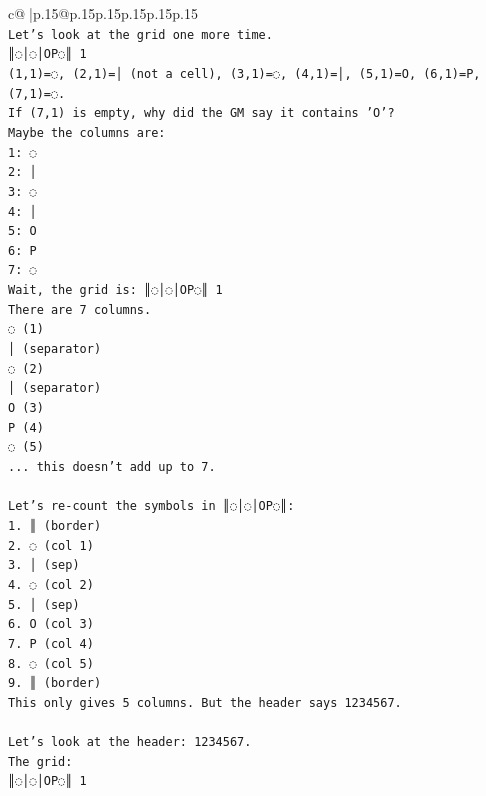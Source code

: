 \documentclass{article}
\begin{document}
{\begin{supertabular}{c@{$\;$}|p{.15\linewidth}@{}p{.15\linewidth}p{.15\linewidth}p{.15\linewidth}p{.15\linewidth}p{.15\linewidth}}
{{{\\ 
\texttt{Let's look at the grid one more time.} \\
\texttt{║◌│◌│OP◌║ 1} \\
\texttt{(1,1)=◌, (2,1)=│ (not a cell), (3,1)=◌, (4,1)=│, (5,1)=O, (6,1)=P, (7,1)=◌.} \\
\texttt{If (7,1) is empty, why did the GM say it contains 'O'?} \\
\texttt{Maybe the columns are:} \\
\texttt{1: ◌} \\
\texttt{2: │} \\
\texttt{3: ◌} \\
\texttt{4: │} \\
\texttt{5: O} \\
\texttt{6: P} \\
\texttt{7: ◌} \\
\texttt{Wait, the grid is: ║◌│◌│OP◌║ 1} \\
\texttt{There are 7 columns.} \\
\texttt{◌ (1)} \\
\texttt{│ (separator)} \\
\texttt{◌ (2)} \\
\texttt{│ (separator)} \\
\texttt{O (3)} \\
\texttt{P (4)} \\
\texttt{◌ (5)} \\
\texttt{... this doesn't add up to 7.} \\
\\ 
\texttt{Let's re{-}count the symbols in ║◌│◌│OP◌║:} \\
\texttt{1. ║ (border)} \\
\texttt{2. ◌ (col 1)} \\
\texttt{3. │ (sep)} \\
\texttt{4. ◌ (col 2)} \\
\texttt{5. │ (sep)} \\
\texttt{6. O (col 3)} \\
\texttt{7. P (col 4)} \\
\texttt{8. ◌ (col 5)} \\
\texttt{9. ║ (border)} \\
\texttt{This only gives 5 columns. But the header says 1234567.} \\
\\ 
\texttt{Let's look at the header: 1234567.} \\
\texttt{The grid:} \\
\texttt{║◌│◌│OP◌║ 1} \\
}}}
\end{supertabular}}
\end{document}
